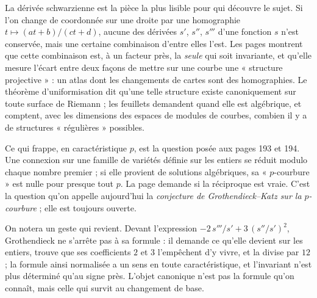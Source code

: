 \documentclass[11pt,a4paper]{article}
\begin{document}
\begin{resume}
La dérivée schwarzienne est la pièce la plus lisible pour qui découvre le
sujet. Si l'on change de coordonnée sur une droite par une homographie
$t \mapsto (at+b)/(ct+d)$, aucune des dérivées $s'$, $s''$, $s'''$ d'une fonction
$s$ n'est conservée, mais une certaine combinaison d'entre elles l'est. Les
pages montrent que cette combinaison est, à un facteur près, la \emph{seule}
qui soit invariante, et qu'elle mesure l'écart entre deux façons de mettre
sur une courbe une « structure projective » : un atlas dont les changements
de cartes sont des homographies. Le théorème d'uniformisation dit qu'une
telle structure existe canoniquement sur toute surface de Riemann ; les
feuillets demandent quand elle est algébrique, et comptent, avec les
dimensions des espaces de modules de courbes, combien il y a de structures
« régulières » possibles.

Ce qui frappe, en caractéristique $p$, est la question posée aux pages 193
et 194. Une connexion sur une famille de variétés définie sur les entiers se
réduit modulo chaque nombre premier ; si elle provient de solutions
algébriques, sa « $p$-courbure » est nulle pour presque tout $p$. La page
demande si la réciproque est vraie. C'est la question qu'on appelle
aujourd'hui la \emph{conjecture de Grothendieck--Katz sur la $p$-courbure} ;
elle est toujours ouverte.

On notera un geste qui revient. Devant l'expression $-2\,s'''/s' +
3\,(s''/s')^2$, Grothendieck ne s'arrête pas à sa formule : il demande ce
qu'elle devient sur les entiers, trouve que ses coefficients $2$ et $3$
l'empêchent d'y vivre, et la divise par $12$ ; la formule ainsi normalisée
a un sens en toute caractéristique, et l'invariant n'est plus déterminé
qu'au signe près. L'objet canonique n'est pas la formule qu'on connaît,
mais celle qui survit au changement de base.

\end{resume}
\end{document}
